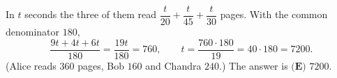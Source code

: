 In $t$ seconds the three of them read $\dfrac t{20}+\dfrac t{45}+\dfrac t{30}$ pages. With the common denominator $180$,
\[\dfrac{9t+4t+6t}{180}=\dfrac{19t}{180}=760,\qquad t=\dfrac{760\cdot180}{19}=40\cdot180=7200.\]
(Alice reads $360$ pages, Bob $160$ and Chandra $240$.) The answer is $\boxed{\textbf{(E) } 7200}$.
